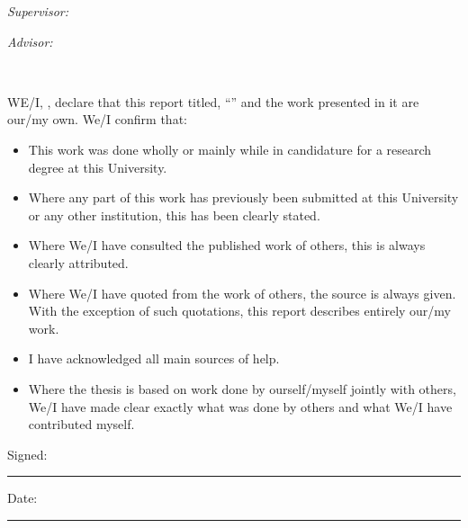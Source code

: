 \documentclass[
11pt, %
english, %
singlespacing, %
headsepline, %
]{mediaproject} %
\begin{document}
\begin{titlepage}
\begin{center}
 \begin{minipage}[t]{0.4\textwidth}
     \begin{flushleft} \large
         \emph{Supervisor:}\\
         \href{https://www.tu-ilmenau.de/vwds/team/wolfgang-broll/}{\supname}
     \end{flushleft}
 \end{minipage}
 \begin{minipage}[t]{0.4\textwidth}
     \begin{flushright} \large
         \emph{Advisor:} \\
         \href{https://www.tu-ilmenau.de/vwds/team/christian-kunert/}{\examname} 
     \end{flushright}
 \end{minipage}\\[3cm]

\vfill
\end{center}
\end{titlepage}


\begin{declaration}
\addchaptertocentry{\authorshipname} %
\noindent WE/I, \authorname, declare that this report titled, \enquote{\ttitle} and the work presented in it are our/my own. We/I confirm that:

\begin{itemize} 
\item This work was done wholly or mainly while in candidature for a research degree at this University.
\item Where any part of this work has previously been submitted at this University or any other institution, this has been clearly stated.
\item Where We/I have consulted the published work of others, this is always clearly attributed.
\item Where We/I have quoted from the work of others, the source is always given. With the exception of such quotations, this report describes entirely our/my work.
\item I have acknowledged all main sources of help.
\item Where the thesis is based on work done by ourself/myself jointly with others, We/I have made clear exactly what was done by others and what We/I have contributed myself.
\end{itemize}
 
\noindent Signed:\\
\rule[0.5em]{25em}{0.5pt} %
 
\noindent Date:\\
\rule[0.5em]{25em}{0.5pt} %
\end{declaration}
\end{document}
